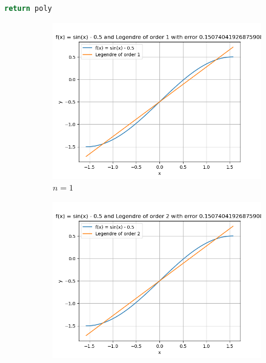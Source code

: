 \documentclass[conference,onecolumn]{IEEEtran}
\begin{document}
\begin{enumerate}[label=\arabic{enumi}.]
\begin{enumerate}
\begin{lstlisting}[language=Python]
    return poly
                        \end{lstlisting}
                        \begin{figure}[H]
                              \centering
                              \begin{subfigure}{0.49\linewidth}
                                    \centering
                                    \includegraphics[width=\linewidth]{figs/Q1_d_poly_1.png}
                                    \caption{$n = 1$}
                              \end{subfigure}
                              \begin{subfigure}{0.49\linewidth}
                                    \centering
                                    \includegraphics[width=\linewidth]{figs/Q1_d_poly_2.png}

\end{subfigure}
\end{figure}
\end{enumerate}
\end{enumerate}
\end{document}

